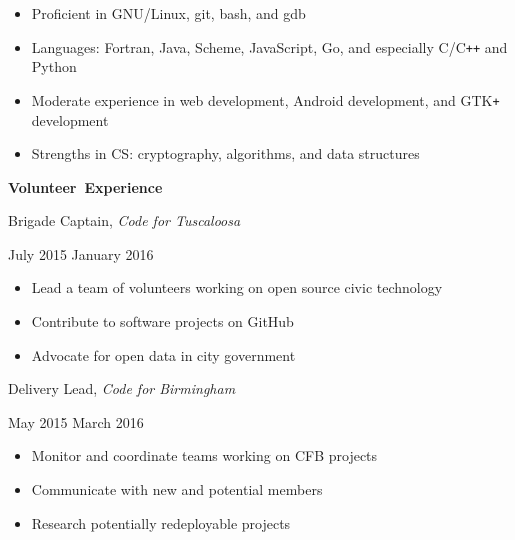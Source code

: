 \documentclass[11pt]{article}
\begin{document}
\begin{itemize}
  \item Proficient in GNU/Linux, git, bash, and gdb
  \item Languages: Fortran, Java, Scheme, JavaScript, Go, and especially C/C\texttt{++} and Python
  \item Moderate experience in web development, Android development, and GTK\texttt{+} development
  \item Strengths in CS: cryptography, algorithms, and data structures
\end{itemize}

\vspace{0.8em}
\hbox{\large \textbf{Volunteer Experience}}

\begin{minipage}[t]{0.7\textwidth}
\flushleft
Brigade Captain, \textit{Code for Tuscaloosa}\\
\end{minipage}
\begin{minipage}[t]{0.25\textwidth}
\flushright
July 2015 \space \textemdash \space January 2016\\
\end{minipage}

\begin{itemize}
  \item Lead a team of volunteers working on open source civic technology
  \item Contribute to software projects on GitHub
  \item Advocate for open data in city government
\end{itemize}

\vspace{0.4em}
\begin{minipage}[t]{0.7\textwidth}
\flushleft
Delivery Lead, \textit{Code for Birmingham}\\
\end{minipage}
\begin{minipage}[t]{0.25\textwidth}
\flushright
May 2015 \space \textemdash \space March 2016\\
\end{minipage}

\begin{itemize}
  \item Monitor and coordinate teams working on CFB projects
  \item Communicate with new and potential members
  \item Research potentially redeployable projects
\end{itemize}
\end{document}
